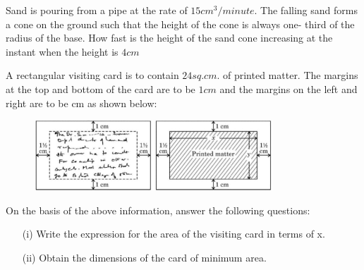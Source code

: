 
\item Sand is pouring from a pipe at the rate of $ 15 cm^3/minute$. The falling sand forms a cone on the ground such that the height of the cone is always one- third of the radius of the base. How fast is the height of the sand cone increasing at the instant when the height is $4cm$	 


\item A rectangular visiting card is to contain $24 sq.cm.$ of printed matter. The margins at the top and bottom of the card are to be $1 cm$ and the margins on the left and right are to be cm as shown below:

\begin{figure}[h!]
\centering
\includegraphics[width=0.8\textwidth]{figs/fig2.jpg}
\label{fig:image2}
\end{figure}

On the basis of the above information, answer the following questions:
\begin{enumerate}
	\item[(i)] Write the expression for the area of the visiting card in terms of x.

	\item[(ii)] Obtain the dimensions of the card of minimum area.



\end{enumerate}



